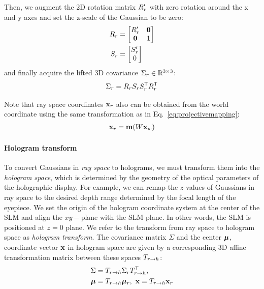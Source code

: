Then, we augment the 2D rotation matrix $R_r'$ with zero rotation around the x and y axes and set the z-scale of the Gaussian to be zero:
\begin{align}
    R_r & = \begin{bmatrix}
        R_r' & \mathbf{0} \\
        \mathbf{0} & 1
    \end{bmatrix} \\
    S_r & = \begin{bmatrix}
        S_r' \\
        0
    \end{bmatrix}
\end{align}
and finally acquire the lifted 3D covariance $\Sigma_r \in \mathbb{R}^{{3}\times{3}}$:
\begin{align}
    \Sigma_r = R_r S_r S_r^\mathsf{T} R_r^\mathsf{T}
\end{align}


Note that ray space coordinates $\mathbf{x}_r$ also can be obtained from the world coordinate using the same transformation as in Eq.~\ref{eq:projectivemapping}:
\begin{align}
    \mathbf{x}_r = \mathbf{m} (W\mathbf{x}_w)
\end{align}

\paragraph{\textbf{Hologram transform}}
To convert Gaussians in \textit{ray space} to holograms, we must transform them into the \textit{hologram space}, which is determined by the geometry of the optical parameters of the holographic display. For example, we can remap the $z$-values of Gaussians in ray space to the desired depth range determined by the focal length of the eyepiece. We set the origin of the hologram coordinate system at the center of the SLM and align the $xy-$plane with the SLM plane. In other words, the SLM is positioned at $z=0$ plane. We refer to the transform from ray space to hologram space as \textit{hologram transform}. The covariance matrix $\Sigma$ and the center ${\bm{\mu}}$, coordinate vector $\mathbf{x}$ in hologram space are given by a corresponding 3D affine transformation matrix between these spaces $T_{r \rightarrow h}$:
\begin{align}
    \Sigma &= T_{r \rightarrow h} \Sigma_r T_{r \rightarrow h}^\mathsf{T}, \\
    {\bm{\mu}} &= T_{r \rightarrow h} {\bm{\mu}}_r, \,\, \mathbf{x} = T_{r \rightarrow h}  \mathbf{x}_r
\end{align}

